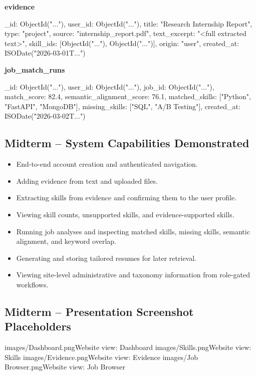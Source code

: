 \documentclass[11pt]{article}
\begin{document}
\noindent
\textbf{evidence}
\begin{TerminalBlock}
{
  _id: ObjectId("..."),
  user_id: ObjectId("..."),
  title: "Research Internship Report",
  type: "project",
  source: "internship_report.pdf",
  text_excerpt: "<full extracted text>",
  skill_ids: [ObjectId("..."), ObjectId("...")],
  origin: "user",
  created_at: ISODate("2026-03-01T...")
}
\end{TerminalBlock}

\noindent
\textbf{job\_match\_runs}
\begin{TerminalBlock}
{
  _id: ObjectId("..."),
  user_id: ObjectId("..."),
  job_id: ObjectId("..."),
  match_score: 82.4,
  semantic_alignment_score: 76.1,
  matched_skills: ["Python", "FastAPI", "MongoDB"],
  missing_skills: ["SQL", "A/B Testing"],
  created_at: ISODate("2026-03-02T...")
}
\end{TerminalBlock}

\subsection*{Midterm -- System Capabilities Demonstrated}
\begin{itemize}
  \item End-to-end account creation and authenticated navigation.
  \item Adding evidence from text and uploaded files.
  \item Extracting skills from evidence and confirming them to the user profile.
  \item Viewing skill counts, unsupported skills, and evidence-supported skills.
  \item Running job analyses and inspecting matched skills, missing skills, semantic alignment, and keyword overlap.
  \item Generating and storing tailored resumes for later retrieval.
  \item Viewing site-level administrative and taxonomy information from role-gated workflows.
\end{itemize}

\subsection*{Midterm -- Presentation Screenshot Placeholders}

  {images/Dashboard.png}{Website view: Dashboard}
  {images/Skills.png}{Website view: Skills}
  {images/Evidence.png}{Website view: Evidence}
  {images/Job Browser.png}{Website view: Job Browser}
\end{document}
